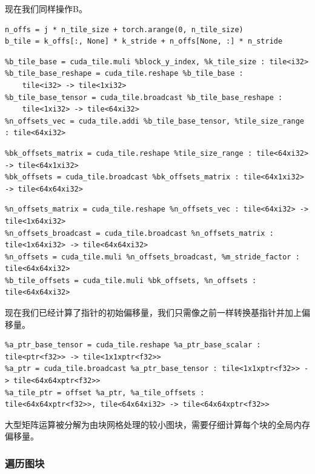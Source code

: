 \documentclass{article}
\begin{document}
现在我们同样操作B。


\begin{lstlisting}
n_offs = j * n_tile_size + torch.arange(0, n_tile_size)
b_tile = k_offs[:, None] * k_stride + n_offs[None, :] * n_stride
\end{lstlisting}

\begin{lstlisting}
%b_tile_base = cuda_tile.muli %block_y_index, %k_tile_size : tile<i32>
%b_tile_base_reshape = cuda_tile.reshape %b_tile_base :
    tile<i32> -> tile<1xi32>
%b_tile_base_tensor = cuda_tile.broadcast %b_tile_base_reshape :
    tile<1xi32> -> tile<64xi32>
%n_offsets_vec = cuda_tile.addi %b_tile_base_tensor, %tile_size_range : tile<64xi32>
\end{lstlisting}

\begin{lstlisting}
%bk_offsets_matrix = cuda_tile.reshape %tile_size_range : tile<64xi32> -> tile<64x1xi32>
%bk_offsets = cuda_tile.broadcast %bk_offsets_matrix : tile<64x1xi32> -> tile<64x64xi32>
\end{lstlisting}

\begin{lstlisting}
%n_offsets_matrix = cuda_tile.reshape %n_offsets_vec : tile<64xi32> -> tile<1x64xi32>
%n_offsets_broadcast = cuda_tile.broadcast %n_offsets_matrix :  tile<1x64xi32> -> tile<64x64xi32>
%n_offsets = cuda_tile.muli %n_offsets_broadcast, %m_stride_factor : tile<64x64xi32>
%b_tile_offsets = cuda_tile.muli %bk_offsets, %n_offsets : tile<64x64xi32>
\end{lstlisting}

现在我们已经计算了指针的初始偏移量，我们只需像之前一样转换基指针并加上偏移量。


\begin{lstlisting}
%a_ptr_base_tensor = cuda_tile.reshape %a_ptr_base_scalar :
tile<ptr<f32>> -> tile<1x1xptr<f32>>
%a_ptr = cuda_tile.broadcast %a_ptr_base_tensor : tile<1x1xptr<f32>> -> tile<64x64xptr<f32>>
%a_tile_ptr = offset %a_ptr, %a_tile_offsets :
tile<64x64xptr<f32>>, tile<64x64xi32> -> tile<64x64xptr<f32>>
\end{lstlisting}

大型矩阵运算被分解为由块网格处理的较小图块，需要仔细计算每个块的全局内存偏移量。



\subsubsection{遍历图块}
\end{document}
